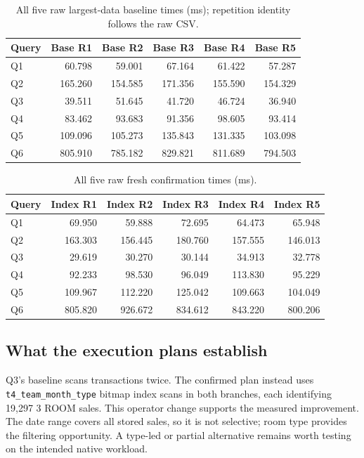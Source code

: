\documentclass[11pt,a4paper]{article}
\begin{document}
\begin{table}[H]\centering\small
\begin{tabular}{lrrrrr}
\toprule
Query & Base R1 & Base R2 & Base R3 & Base R4 & Base R5 \\
\midrule
Q1 & 60.798 & 59.001 & 67.164 & 61.422 & 57.287 \\
Q2 & 165.260 & 154.585 & 171.356 & 155.590 & 154.329 \\
Q3 & 39.511 & 51.645 & 41.720 & 46.724 & 36.940 \\
Q4 & 83.462 & 93.683 & 91.356 & 98.605 & 93.414 \\
Q5 & 109.096 & 105.273 & 135.843 & 131.335 & 103.098 \\
Q6 & 805.910 & 785.182 & 829.821 & 811.689 & 794.503 \\
\bottomrule
\end{tabular}
\caption{All five raw largest-data baseline times (ms); repetition identity follows the raw CSV.}
\end{table}

\begin{table}[H]\centering\small
\begin{tabular}{lrrrrr}
\toprule
Query & Index R1 & Index R2 & Index R3 & Index R4 & Index R5 \\
\midrule
Q1 & 69.950 & 59.888 & 72.695 & 64.473 & 65.948 \\
Q2 & 163.303 & 156.445 & 180.760 & 157.555 & 146.013 \\
Q3 & 29.619 & 30.270 & 30.144 & 34.913 & 32.778 \\
Q4 & 92.233 & 98.530 & 96.049 & 113.830 & 95.229 \\
Q5 & 109.967 & 112.220 & 125.042 & 109.663 & 104.049 \\
Q6 & 805.820 & 926.672 & 834.612 & 843.220 & 800.206 \\
\bottomrule
\end{tabular}
\caption{All five raw fresh confirmation times (ms).}
\end{table}

\subsection{What the execution plans establish}
Q3's baseline scans transactions twice. The confirmed plan instead uses \texttt{t4\_team\_month\_type} bitmap index scans in both branches, each identifying 19,297 3 ROOM sales. This operator change supports the measured improvement. The date range covers all stored sales, so it is not selective; room type provides the filtering opportunity. A type-led or partial alternative remains worth testing on the intended native workload.
\end{document}
